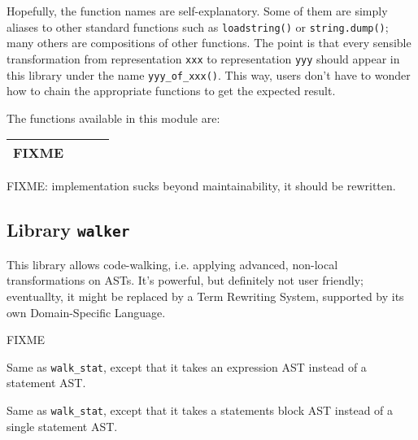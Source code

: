 Hopefully, the function names are self-explanatory. Some of them are
simply aliases to other standard functions such as {\tt loadstring()}
or {\tt string.dump()}; many others are compositions of other
functions. The point is that every sensible transformation from
representation {\tt xxx} to representation {\tt yyy} should appear in
this library under the name {\tt yyy\_of\_xxx()}. This way, users
don't have to wonder how to chain the appropriate functions to get the
expected result.

The functions available in this module are:

\begin{tabular}{|l|l|l|l|}
  \hline
  FIXME \\\hline
\end{tabular}

FIXME: implementation sucks beyond maintainability, it should be
rewritten.

\subsection{Library {\tt walker}}
This library allows code-walking, i.e. applying advanced, non-local 
transformations on ASTs. It's powerful, but definitely not user
friendly; eventuallty, it might be replaced by a Term Rewriting
System, supported by its own Domain-Specific Language.

FIXME


Same as {\tt walk\_stat}, except that it takes an expression AST
instead of a statement AST. 

Same as {\tt walk\_stat}, except that it takes a statements block AST
instead of a single statement AST.
